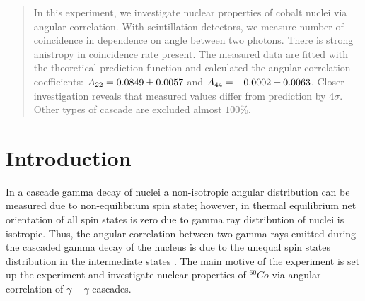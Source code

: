 \begin{abstract}
   In this experiment, we investigate nuclear properties of cobalt nuclei via angular correlation. With scintillation detectors, we measure number of coincidence in dependence on angle between two photons. There is strong anistropy in coincidence rate present. The measured data are fitted with the theoretical prediction function and calculated the angular correlation coefficients: $ A_{22}= \num{0.0849 +- 0.0057} $ and $A_{44}=\num{-0.0002 +- 0.0063}  $. Closer investigation reveals that measured values differ from prediction by $4\sigma$. Other types of cascade are excluded almost $100\%$.
\end{abstract}

\section{Introduction}
In a cascade gamma decay of nuclei a non-isotropic angular distribution can be measured due to non-equilibrium spin state; however, in thermal equilibrium net orientation of all spin states is zero due to gamma ray distribution of nuclei is isotropic. Thus, the angular correlation between two gamma rays emitted during the cascaded gamma decay of
the nucleus is due to the unequal spin states distribution in the intermediate states \cite{descr}.
The main motive of the experiment is set up the experiment and investigate nuclear properties of $ ^60Co $ via angular correlation of $ \gamma-\gamma $ cascades\cite{descr}.
